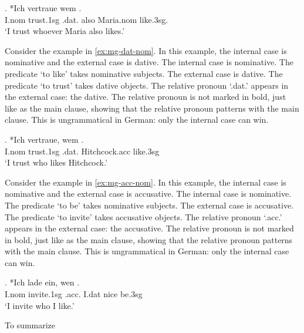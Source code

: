 \exg. *Ich vertraue wem   . \\
I.\ac{nom} trust.1\ac{sg}\scsub{[dat]} .\ac{dat}. also Maria.\ac{nom} like.3\ac{sg}\scsub{[acc]}.\\
`I trust whoever Maria also likes.' \label{ex:mg-dat-acc}

Consider the example in \ref{ex:mg-dat-nom}. In this example, the internal case is nominative and the external case is dative.
The internal case is nominative. The predicate  `to like' takes nominative subjects.
The external case is dative. The predicate  `to trust' takes dative objects.
The relative pronoun  `.\ac{dat}.' appears in the external case: the dative. The relative pronoun is not marked in bold, just like as the main clause, showing that the relative pronoun patterns with the main clause.
This is ungrammatical in German: only the internal case can win.

\exg. *Ich vertraue, wem  .\\
I.\ac{nom} trust.1\ac{sg}\scsub{[dat]} .\ac{dat}. Hitchcock.\ac{acc} like.3\ac{sg}\scsub{[nom]}\\
`I trust who likes Hitchcock.' \label{ex:mg-dat-nom}

Consider the example in \ref{ex:mg-acc-nom}. In this example, the internal case is nominative and the external case is accusative.
The internal case is nominative. The predicate  `to be' takes nominative subjects.
The external case is accusative. The predicate  `to invite' takes accusative objects.
The relative pronoun  `.\ac{acc}.' appears in the external case: the accusative. The relative pronoun is not marked in bold, just like as the main clause, showing that the relative pronoun patterns with the main clause.
This is ungrammatical in German: only the internal case can win.

\exg. *Ich {lade ein}, wen   .\\
I.\ac{nom} invite.1\ac{sg}\scsub{[acc]} .\ac{acc}. I.\ac{dat} nice be.3\ac{sg}\scsub{[nom]}\\
`I invite who I like.' \label{ex:mg-acc-nom}

To summarize


